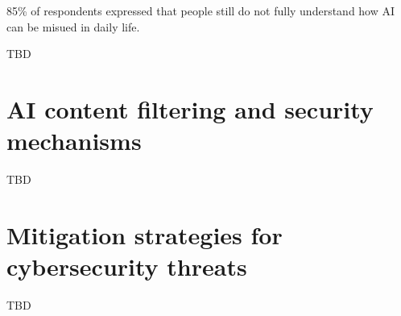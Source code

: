 85\% of respondents expressed that people still do not fully understand how AI can be misued in daily life.

TBD

\section{AI content filtering and security mechanisms}

TBD


\section{Mitigation strategies for cybersecurity threats}
TBD


